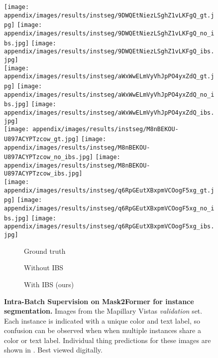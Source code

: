 \documentclass[10pt,twocolumn,letterpaper]{article}
\begin{document}
\begin{figure*}[t]
\centering
\texttt{[image: appendix/images/results/instseg/9DWQEtNiezLSghZ1vLKFgQ\_gt.jpg]}
\texttt{[image: appendix/images/results/instseg/9DWQEtNiezLSghZ1vLKFgQ\_no\_ibs.jpg]}
\texttt{[image: appendix/images/results/instseg/9DWQEtNiezLSghZ1vLKFgQ\_ibs.jpg]}
\\

\texttt{[image: appendix/images/results/instseg/aWxWwELmVyVhJpPO4yxZdQ\_gt.jpg]}
\texttt{[image: appendix/images/results/instseg/aWxWwELmVyVhJpPO4yxZdQ\_no\_ibs.jpg]}
\texttt{[image: appendix/images/results/instseg/aWxWwELmVyVhJpPO4yxZdQ\_ibs.jpg]}
\\

\texttt{[image: appendix/images/results/instseg/M8nBEKOU-U897ACYPTzcow\_gt.jpg]}
\texttt{[image: appendix/images/results/instseg/M8nBEKOU-U897ACYPTzcow\_no\_ibs.jpg]}
\texttt{[image: appendix/images/results/instseg/M8nBEKOU-U897ACYPTzcow\_ibs.jpg]}
\\

\texttt{[image: appendix/images/results/instseg/q6RpGEutXBxpmVCOogF5xg\_gt.jpg]}
\texttt{[image: appendix/images/results/instseg/q6RpGEutXBxpmVCOogF5xg\_no\_ibs.jpg]}
\texttt{[image: appendix/images/results/instseg/q6RpGEutXBxpmVCOogF5xg\_ibs.jpg]}
\\

\begin{subfigure}[b]{0.28\textwidth}
 \centering
 \caption{Ground truth}
\end{subfigure}
\begin{subfigure}[b]{0.28\textwidth}
 \centering
 \caption{Without IBS}
\end{subfigure}
\begin{subfigure}[b]{0.28\textwidth}
 \centering
 \caption{With IBS (ours)}
\end{subfigure}

\vspace{-10pt}

\caption{\textbf{Intra-Batch Supervision on Mask2Former for instance segmentation.} Images from the Mapillary Vistas \textit{validation} set. Each instance is indicated with a unique color and text label, so confusion can be observed when when multiple instances share a color or text label. Individual thing predictions for these images are shown in . Best viewed digitally.}  
\label{fig:results_m2f_inst_seg_overall}
\end{figure*}   
\end{document}
